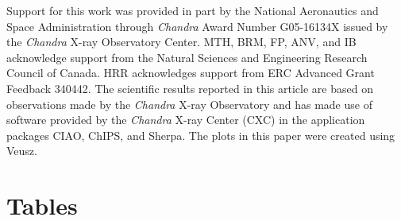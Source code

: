 \documentclass[twocolumn]{aastex6}
\begin{document}
\acknowledgments
Support for this work was provided in part by the National Aeronautics and Space Administration through {\it Chandra} Award Number G05-16134X issued by the {\it Chandra} X-ray Observatory Center. MTH, BRM, FP, ANV, and IB acknowledge support from the Natural Sciences and Engineering Research Council of Canada. HRR acknowledges support from ERC Advanced Grant Feedback 340442. The scientific results reported in this article are based on observations made by the {\it Chandra} X-ray Observatory and has made use of software provided by the {\it Chandra} X-ray Center (CXC) in the application packages CIAO, ChIPS, and Sherpa. The plots in this paper were created using Veusz.



\appendix

\section{Tables}
\end{document}

